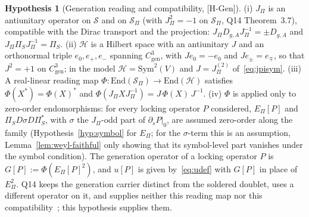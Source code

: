 \documentclass[11pt]{article}
\theoremstyle{definition}
\newtheorem{hypothesis}{Hypothesis}
\newcommand{\Cgen}{C^3_{\mathrm{gen}}}
\newcommand{\EPi}{E_\Pi}
\newcommand{\PiS}{\Pi_S}
\begin{document}
    \begin{hypothesis}[Generation reading and compatibility, {[H-Gen]}]
      \label{hyp:generation}
      (i) $J_\Pi$ is an antiunitary operator on $\mathcal S$ and on $\mathcal S_\Pi$ (with $J_\Pi^2=-1$ on $\mathcal
      S_\Pi$, Q14 Theorem~3.7), compatible with the Dirac transport and the projection:
      $J_\Pi D_{g,A}J_\Pi^{-1}=\pm D_{g,A}$ and $J_\Pi\PiS J_\Pi^{-1}=\PiS$.
      (ii) $\mathcal H$ is a Hilbert space with an antiunitary $J$ and an orthonormal triple $e_0,e_+,e_-$ spanning
      $\Cgen$, with $Je_0=-e_0$ and $Je_\pm=e_\mp$, so that $J^2=+1$ on $\Cgen$; in the model
      $\mathcal H=\mathrm{Sym}^2(V)$ and $J=J_\Pi^{(2)}$ of~\eqref{eq:jpisym}.
      (iii) A real-linear reading map $\Phi:\mathrm{End}(\mathcal S_\Pi)\to\mathrm{End}(\mathcal H)$ satisfies
      $\Phi(X^{*})=\Phi(X)^{*}$ and $\Phi(J_\Pi XJ_\Pi^{-1})=J\,\Phi(X)\,J^{-1}$.
      (iv) $\Phi$ is applied only to zero-order endomorphisms: for every locking operator $P$ considered, $\EPi[P]$ and
      $\PiS D\sigma D\PiS^{*}$, with $\sigma$ the $J_\Pi$-odd part of $\partial_sP|_0$, are assumed zero-order along the family
      (Hypothesis~\ref{hyp:symbol} for $\EPi$; for the $\sigma$-term this is an assumption, Lemma~\ref{lem:weyl-faithful} only
      showing that its symbol-level part vanishes under the symbol condition).
      The generation operator of a locking operator $P$ is $G[P]:=\Phi(\EPi[P]^2)$, and $u[P]$ is given
      by~\eqref{eq:udef} with $G[P]$ in place of $E_\Pi^2$.
      Q14 keeps the generation carrier distinct from the soldered doublet, uses a different operator on it, and supplies
      neither this reading map nor this compatibility~\cite{Beau2026q14}; this hypothesis supplies them.
    \end{hypothesis}
\end{document}
